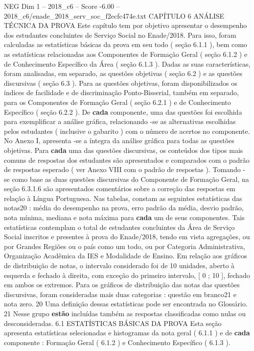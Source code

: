 \begin{textsample}{NEG Dim 1 – 2018\_c6 – Score -6.00 – 2018\_c6/enade\_2018\_serv\_soc\_f2ecfc474e.txt}  \label{ex:f1_neg_191}
CAPÍTULO 6 ANÁLISE TÉCNICA DA PROVA Este capítulo tem por objetivo apresentar o desempenho dos estudantes concluintes de Serviço Social no Enade/2018.
Para isso, foram calculadas as estatísticas básicas da prova em seu todo ( seção 6.1.1 ), bem como as estatísticas relacionadas aos Componentes de Formação Geral ( seção 6.1.2 ) e de Conhecimento Específico da Área ( seção 6.1.3 ).
Dadas as suas características, foram analisadas, em separado, as questões objetivas ( seção 6.2 ) e as questões discursivas ( seção 6.3 ).
Para as questões objetivas, foram disponibilizados os índices de facilidade e de discriminação Ponto-Bisserial, também em separado, para os Componentes de Formação Geral ( seção 6.2.1 ) e de Conhecimento Específico ( seção 6.2.2 ).
De \textbf{cada} componente, uma das questões foi escolhida para exemplificar a análise gráfica, relacionando -se as alternativas escolhidas pelos estudantes ( inclusive o gabarito ) com o número de acertos no componente.
No Anexo I, apresenta -se a íntegra da análise gráfica para todas as questões objetivas.
Para \textbf{cada} uma das questões discursivas, os conteúdos dos tipos mais comuns de respostas dos estudantes são apresentados e comparados com o padrão de respostas esperado ( ver Anexo VIII com o padrão de respostas ).
Tomando -se como base as duas questões discursivas do Componente de Formação Geral, na seção 6.3.1.6 são apresentados comentários sobre a correção das respostas em relação à Língua Portuguesa.
Nas tabelas, constam as seguintes estatísticas das notas20 : média do desempenho na prova, erro padrão da média, desvio padrão, nota mínima, mediana e nota máxima para \textbf{cada} um de seus componentes.
Tais estatísticas contemplam o total de estudantes concluintes da Área de Serviço Social inscritos e presentes à prova do Enade/2018, tendo em vista agregações, ou por Grandes Regiões ou o país como um todo, ou por Categoria Administrativa, Organização Acadêmica da IES e Modalidade de Ensino.
Em relação aos gráficos de distribuição de notas, o intervalo considerado foi de 10 unidades, aberto à esquerda e fechado à direita, com exceção do primeiro intervalo, [ 0 ; 10 ], fechado em ambos os extremos.
Para os gráficos de distribuição das notas das questões discursivas, foram consideradas mais duas categorias : questão em branco21 e nota zero. 20 Uma definição dessas estatísticas pode ser encontrada no Glossário. 21 Nesse grupo \textbf{estão} incluídas também as respostas classificadas como nulas ou desconsideradas. 6.1 ESTATÍSTICAS BÁSICAS DA PROVA Esta seção apresenta estatísticas selecionadas e histogramas da nota geral ( 6.1.1 ) e de \textbf{cada} componente : Formação Geral ( 6.1.2 ) e Conhecimento Específico ( 6.1.3 ).

\end{textsample}
